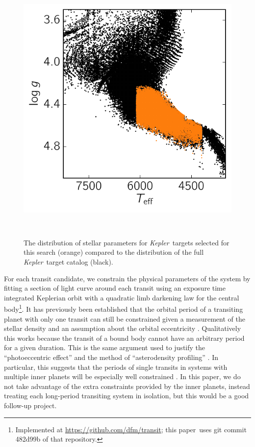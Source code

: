 \documentclass[manuscript, letterpaper]{aastex6}
\makeatletter
\let\origsubsection\subsection
\renewcommand\subsection{\@ifstar{\starsubsection}{\nostarsubsection}}
\newcommand\nostarsubsection[1]{\subsectionprelude\origsubsection{#1}}
\newcommand\starsubsection[1]{\subsectionprelude\origsubsection*{#1}}
\newcommand\subsectionprelude{\vspace{1em}}
\newcommand{\project}[1]{\textsl{#1}}
\newcommand{\kepler}{\project{Kepler}}
\newcommand{\dfmfiglabel}[1]{\label{fig:#1}}
\newcommand{\paper}{paper}
\makeatother
\begin{document}
\begin{figure}~\\
\begin{center}
\includegraphics{figures/targets.pdf}
\end{center}
\caption{%
The distribution of stellar parameters for \kepler\ targets selected for this
search (orange) compared to the distribution of the full \kepler\ target
catalog (black).
\dfmfiglabel{targets}}~\\
\end{figure}


\subsection{Parameter estimation}

For each transit candidate, we constrain the physical parameters of the system
by fitting a section of light curve around each transit using an exposure time
integrated  Keplerian orbit with a quadratic limb darkening law for the
central body\footnote{Implemented at \url{https://github.com/dfm/transit};
this \paper\ uses git commit \textsf{482d99b} of that repository.}.
It has previously been established that the orbital period of a transiting
planet with only one transit can still be constrained given a measurement of
the stellar density and an assumption about the orbital eccentricity \cite[for
example][]{Wang:2015, Osborn:2016}.
Qualitatively this works because the transit of a bound body cannot have an
arbitrary period for a given duration.
This is the same argument used to justify the ``photoeccentric effect''
\citep{Dawson:2012} and the method of ``asterodensity profiling''
\citep{Kipping:2014b}.
In particular, this suggests that the periods of single transits in systems
with multiple inner planets will be especially well constrained
\citep{Kipping:2012}.
In this \paper, we do not take advantage of the extra constraints provided by
the inner planets, instead treating each long-period transiting system in
isolation, but this would be a good follow-up project.
\end{document}
